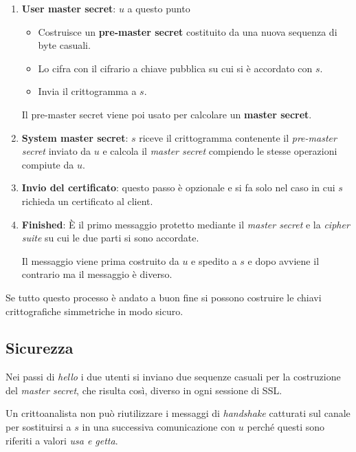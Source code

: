 \begin{enumerate}
	      controllare che
	      \begin{itemize}
		      \item Il certificato sia ancora valido.
		      \item La CA che ha firmato il certificato sia tra quelle \emph{fidate}.
		      \item La firma apposta sul certificato sia autentica.
	      \end{itemize}
	\item \textbf{User master secret}: $u$ a questo punto
	      \begin{itemize}
		      \item Costruisce un \textbf{pre-master secret} costituito da una nuova sequenza di byte casuali.
		      \item Lo cifra con il cifrario a chiave pubblica su cui si \`e accordato con $s$.
		      \item Invia il crittogramma a $s$.
	      \end{itemize}
	      Il pre-master secret viene poi usato per calcolare un \textbf{master secret}.
	\item \textbf{System master secret}: $s$ riceve il crittogramma contenente il \emph{pre-master secret} inviato
	      da $u$ e calcola il \emph{master secret} compiendo le stesse operazioni compiute da $u$.
	\item \textbf{Invio del certificato}: questo passo \`e opzionale e si fa solo nel caso in cui $s$ richieda un
	      certificato al client.
	\item \textbf{Finished}: \`E il primo messaggio protetto mediante il \emph{master secret} e la \emph{cipher suite}
	      su cui le due parti si sono accordate.

	      Il messaggio viene prima costruito da $u$ e spedito a $s$ e dopo avviene il contrario ma il messaggio \`e
	      diverso.
\end{enumerate}
Se tutto questo processo \`e andato a buon fine si possono costruire le chiavi crittografiche simmetriche in modo
sicuro.

\subsection{Sicurezza}
Nei passi di \emph{hello} i due utenti si inviano due sequenze casuali per la costruzione del \emph{master secret},
che risulta cos\`i, diverso in ogni sessione di SSL.

Un crittoanalista non pu\`o riutilizzare i messaggi di \emph{handshake} catturati sul canale per sostituirsi a $s$
in una successiva comunicazione con $u$ perch\'e questi sono riferiti a valori \emph{usa e getta}.

